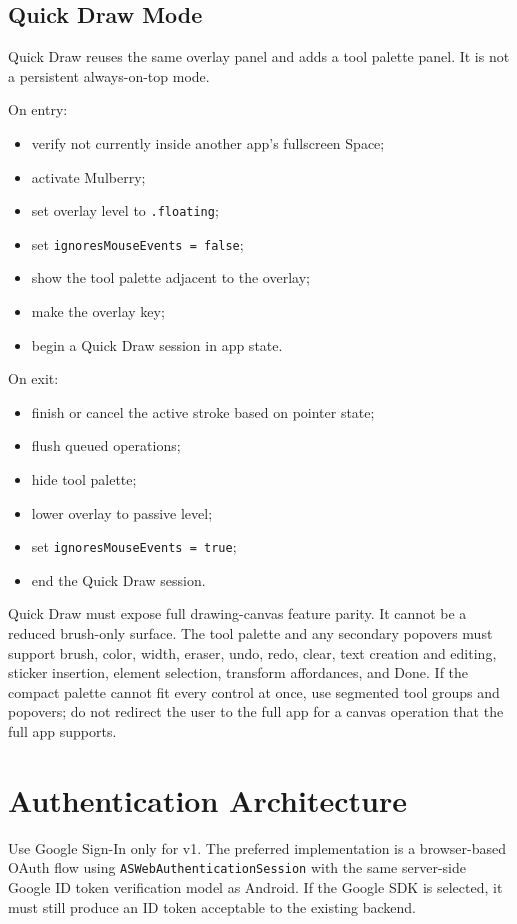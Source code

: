 \documentclass[11pt]{article}
\begin{document}
\subsection{Quick Draw Mode}

Quick Draw reuses the same overlay panel and adds a tool palette panel. It is not a persistent always-on-top mode.

On entry:
\begin{itemize}
  \item verify not currently inside another app's fullscreen Space;
  \item activate Mulberry;
  \item set overlay level to \texttt{.floating};
  \item set \texttt{ignoresMouseEvents = false};
  \item show the tool palette adjacent to the overlay;
  \item make the overlay key;
  \item begin a Quick Draw session in app state.
\end{itemize}

On exit:
\begin{itemize}
  \item finish or cancel the active stroke based on pointer state;
  \item flush queued operations;
  \item hide tool palette;
  \item lower overlay to passive level;
  \item set \texttt{ignoresMouseEvents = true};
  \item end the Quick Draw session.
\end{itemize}

Quick Draw must expose full drawing-canvas feature parity. It cannot be a reduced brush-only surface. The tool palette and any secondary popovers must support brush, color, width, eraser, undo, redo, clear, text creation and editing, sticker insertion, element selection, transform affordances, and Done. If the compact palette cannot fit every control at once, use segmented tool groups and popovers; do not redirect the user to the full app for a canvas operation that the full app supports.

\section{Authentication Architecture}

Use Google Sign-In only for v1. The preferred implementation is a browser-based OAuth flow using \texttt{ASWebAuthenticationSession} with the same server-side Google ID token verification model as Android. If the Google SDK is selected, it must still produce an ID token acceptable to the existing backend.
\end{document}

